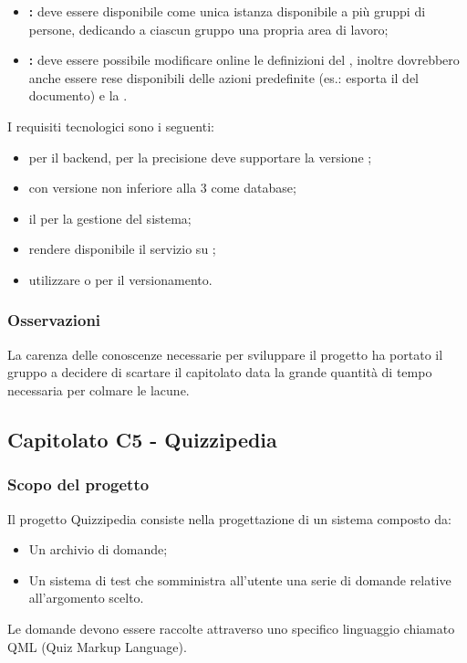 \begin{itemize}
	\item \textbf{:} deve essere disponibile come unica istanza disponibile a più gruppi di persone, dedicando a ciascun gruppo una propria area di lavoro;
	\item \textbf{:} deve essere possibile modificare online le definizioni del , inoltre dovrebbero anche essere rese disponibili delle azioni predefinite (es.: esporta il  del documento)
	e la .
\end{itemize}

I  requisiti tecnologici sono i seguenti:
\begin{itemize}
	\item {} per il backend, per la precisione deve supportare la versione  ;
	\item {} con versione non inferiore alla 3 come database;
	\item il  per la gestione del sistema;
	\item rendere disponibile il servizio su ;
	\item utilizzare  o  per il versionamento.
\end{itemize}

\subsubsection{Osservazioni}
La carenza delle conoscenze necessarie per sviluppare il progetto ha portato il gruppo a decidere di scartare il capitolato data la grande quantità di tempo necessaria per colmare le lacune.


\subsection{Capitolato C5 - Quizzipedia}
\subsubsection{Scopo del progetto}

Il progetto Quizzipedia consiste nella progettazione di un sistema composto da:
\begin{itemize}
	\item Un archivio di domande;
	\item Un sistema di test che somministra all'utente una serie di domande relative all'argomento scelto.
\end{itemize}
Le domande devono essere raccolte attraverso uno specifico linguaggio chiamato QML (Quiz Markup Language).

